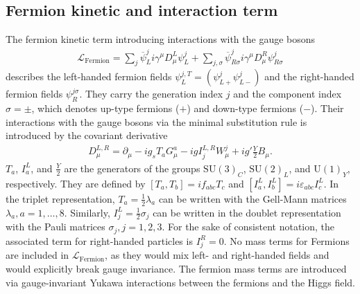 \subsection{Fermion kinetic and interaction term}
\label{sec:sm:lagrangian:fermion}
The fermion kinetic term introducing interactions with the gauge bosons
\begin{align}
    \mathcal{L}_{\text{Fermion}} = \sum_{j} \overline{\psi}_{L}^{j} i \gamma^{\mu} D_{\mu}^{L} \psi_{L}^{j} + \sum_{j, \sigma} \overline{\psi}_{R\sigma}^{j} i \gamma^{\mu} D^{R}_{\mu} \psi^{j}_{R\sigma}
\end{align}
describes the left-handed fermion fields \(\psi_{L}^{j, T} = (\psi_{L+}^{j} \psi_{L-}^{j})\) and the right-handed fermion fields \(\psi_{R}^{j\sigma}\). They carry the generation index \(j\) and the component index \(\sigma=\pm\), which denotes up-type fermions (\(+\)) and down-type fermions (\(-\)). Their interactions with the gauge bosons via the minimal substitution rule is introduced by the covariant derivative
\begin{align}
    D^{L, R}_{\mu} = \partial_{\mu}  - i g_{s} T_{a} G^{a}_{\mu} - i g I^{L,R}_{j} W^{j}_{\mu} + i g' \frac{Y}{2} B_{\mu}.
\end{align}
\(T_{a}\), \(I^{L}_{a}\), and \(\frac{Y}{2}\) are the generators of the groups \(\textrm{SU}(3)_{C}\), \(\textrm{SU}(2)_{L}\), and \(\textrm{U}(1)_{Y}\), respectively. They are defined by \([T_{a}, T_{b}] = i f_{abc} T_{c}\) and \([I^{L}_{a}, I^{L}_{b}] = i \varepsilon_{abc} I^{L}_{c}\). In the triplet representation, \(T_{a} = \frac{1}{2} \lambda_{a}\) can be written with the Gell-Mann matrices \(\lambda_{a}, a=1, \dots, 8\). Similarly, \(I_{j}^{L} = \frac{1}{2} \sigma_{j}\) can be written in the doublet representation with the Pauli matrices \(\sigma_{j}, j=1,2,3\). For the sake of consistent notation, the associated term for right-handed particles is \(I_{j}^{R} = 0\).
No mass terms for Fermions are included in \(\mathcal{L}_{\text{Fermion}}\), as they would mix left- and right-handed fields and would explicitly break gauge invariance. The fermion mass terms are introduced via gauge-invariant Yukawa interactions between the fermions and the Higgs field.

